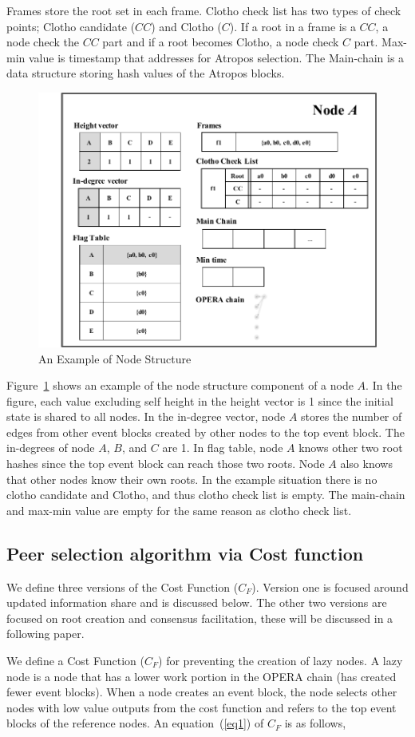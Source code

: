 \documentclass{article}
\begin{document}
Frames store the root set in each frame. Clotho check list has two types of check points; Clotho candidate ($CC$) and Clotho ($C$). If a root in a frame is a $CC$, a node check the $CC$ part and if a root becomes Clotho, a node check $C$ part. Max-min value is timestamp that addresses for Atropos selection. The Main-chain is a data structure storing hash values of the Atropos blocks. 

\begin{figure}[H] \centering  
\includegraphics[width=.5\textwidth]{Node_structure.pdf}
\caption{An Example of Node Structure}
\label{fig:node}
\end{figure}

Figure~\ref{fig:node} shows an example of the node structure component of a node $A$. In the figure, each value excluding self height in the height vector is 1 since the initial state is shared to all nodes. In the in-degree vector, node $A$ stores the number of edges from other event blocks created by other nodes to the top event block. The in-degrees of node $A$, $B$, and $C$ are 1. 
In flag table, node $A$ knows other two root hashes since the top event block can reach those two roots. Node $A$ also knows that other nodes know their own roots. In the example situation there is no clotho candidate and Clotho, and thus clotho check list is empty. The main-chain and max-min value are empty for the same reason as clotho check list. 

\subsection{Peer selection algorithm via Cost function}
We define three versions of the Cost Function ($C_F$). Version one is focused around updated information share and is discussed below. The other two versions are focused on root creation and consensus facilitation, these will be discussed in a following paper.


We define a Cost Function ($C_F$) for preventing the creation of lazy nodes. A lazy node is a node that has a lower work portion in the OPERA chain (has created fewer event blocks). When a node creates an event block, the node selects other nodes with low value outputs from the cost function and refers to the top event blocks of the reference nodes. An equation~(\ref{eq1}) of $C_F$ is as follows,
\end{document}
